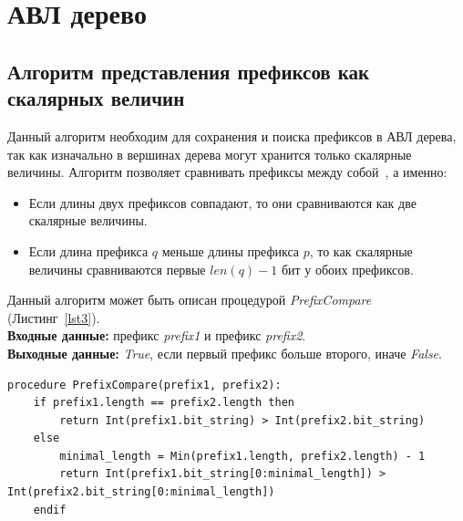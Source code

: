 \documentclass[a4paper, 12pt, titlepage, finall]{extreport}
\begin{document}
        \section{АВЛ дерево}
            \subsection{Алгоритм представления префиксов как скалярных величин}
                Данный алгоритм необходим для сохранения и поиска префиксов в АВЛ дерева, так как изначально в вершинах дерева могут хранится только скалярные величины.
                Алгоритм позволяет сравнивать префиксы между собой~\cite{behdadfar2011coded}, а именно:
                \begin{itemize}
                    \item Если длины двух префиксов совпадают, то они сравниваются как две скалярные величины.
                    \item Если длина префикса $q$ меньше длины префикса $p$, то как скалярные величины сравниваются первые $len(q) - 1$ бит у обоих префиксов.
                \end{itemize}
                Данный алгоритм может быть описан процедурой \emph{PrefixCompare} (Листинг~\ref{lst3}).\\
                {\bf Входные данные:} префикс \emph{prefix1} и префикс \emph{prefix2}.\\
                {\bf Выходные данные:} \emph{True}, если первый префикс больше второго, иначе \emph{False}.
\\
\begin{lstlisting}[caption=Процедура сравнения префиксов как скалярных величин., label=lst3]
procedure PrefixCompare(prefix1, prefix2):
    if prefix1.length == prefix2.length then
        return Int(prefix1.bit_string) > Int(prefix2.bit_string)
    else
        minimal_length = Min(prefix1.length, prefix2.length) - 1
        return Int(prefix1.bit_string[0:minimal_length]) > Int(prefix2.bit_string[0:minimal_length])
    endif
\end{lstlisting}
\end{document}

